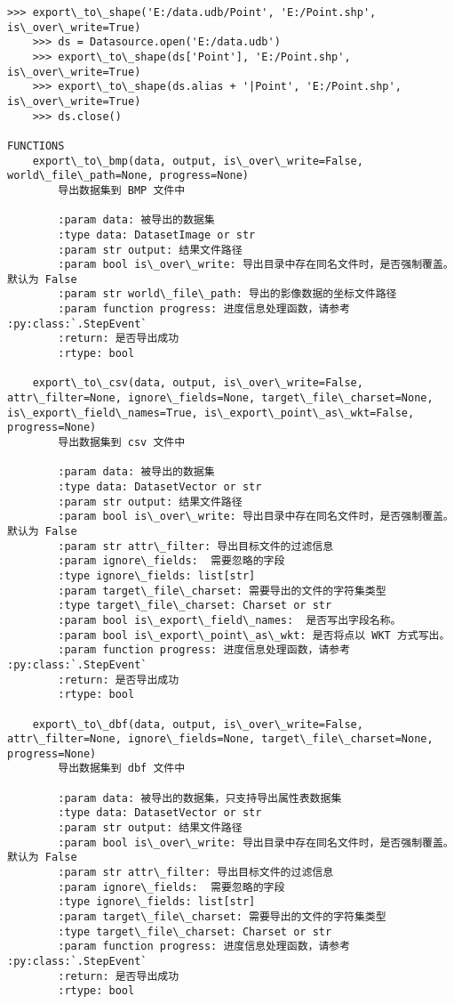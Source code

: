\documentclass[11pt]{article}
\begin{document}
\begin{Verbatim}[commandchars=\\\{\}]
    >>> export\_to\_shape('E:/data.udb/Point', 'E:/Point.shp', is\_over\_write=True)
    >>> ds = Datasource.open('E:/data.udb')
    >>> export\_to\_shape(ds['Point'], 'E:/Point.shp', is\_over\_write=True)
    >>> export\_to\_shape(ds.alias + '|Point', 'E:/Point.shp', is\_over\_write=True)
    >>> ds.close()

FUNCTIONS
    export\_to\_bmp(data, output, is\_over\_write=False, world\_file\_path=None, progress=None)
        导出数据集到 BMP 文件中
        
        :param data: 被导出的数据集
        :type data: DatasetImage or str
        :param str output: 结果文件路径
        :param bool is\_over\_write: 导出目录中存在同名文件时，是否强制覆盖。默认为 False
        :param str world\_file\_path: 导出的影像数据的坐标文件路径
        :param function progress: 进度信息处理函数，请参考 :py:class:`.StepEvent`
        :return: 是否导出成功
        :rtype: bool
    
    export\_to\_csv(data, output, is\_over\_write=False, attr\_filter=None, ignore\_fields=None, target\_file\_charset=None, is\_export\_field\_names=True, is\_export\_point\_as\_wkt=False, progress=None)
        导出数据集到 csv 文件中
        
        :param data: 被导出的数据集
        :type data: DatasetVector or str
        :param str output: 结果文件路径
        :param bool is\_over\_write: 导出目录中存在同名文件时，是否强制覆盖。默认为 False
        :param str attr\_filter: 导出目标文件的过滤信息
        :param ignore\_fields:  需要忽略的字段
        :type ignore\_fields: list[str]
        :param target\_file\_charset: 需要导出的文件的字符集类型
        :type target\_file\_charset: Charset or str
        :param bool is\_export\_field\_names:  是否写出字段名称。
        :param bool is\_export\_point\_as\_wkt: 是否将点以 WKT 方式写出。
        :param function progress: 进度信息处理函数，请参考 :py:class:`.StepEvent`
        :return: 是否导出成功
        :rtype: bool
    
    export\_to\_dbf(data, output, is\_over\_write=False, attr\_filter=None, ignore\_fields=None, target\_file\_charset=None, progress=None)
        导出数据集到 dbf 文件中
        
        :param data: 被导出的数据集，只支持导出属性表数据集
        :type data: DatasetVector or str
        :param str output: 结果文件路径
        :param bool is\_over\_write: 导出目录中存在同名文件时，是否强制覆盖。默认为 False
        :param str attr\_filter: 导出目标文件的过滤信息
        :param ignore\_fields:  需要忽略的字段
        :type ignore\_fields: list[str]
        :param target\_file\_charset: 需要导出的文件的字符集类型
        :type target\_file\_charset: Charset or str
        :param function progress: 进度信息处理函数，请参考 :py:class:`.StepEvent`
        :return: 是否导出成功
        :rtype: bool
    

\end{Verbatim}
\end{document}
